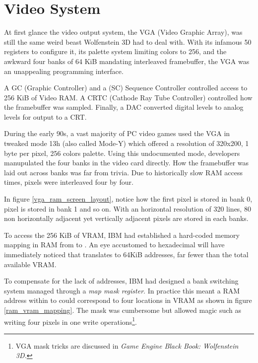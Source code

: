 \section{Video System}
At first glance the video output system, the VGA (Video Graphic Array), was still the same weird beast Wolfenstein 3D had to deal with. With its infamous 50 registers to configure it, its palette system limiting colors to 256, and the awkward four banks of 64 KiB mandating interleaved framebuffer, the VGA was an unappealing programming interface.\\
\par
A GC (Graphic Controller) and a (SC) Sequence Controller controlled access to 256 KiB of Video RAM. A CRTC (Cathode Ray Tube Controller) controlled how the framebuffer was sampled. Finally, a DAC converted digital levels to analog levels for output to a CRT.\\
\par 	
{}
\par
During the early 90s, a vast majority of PC video games used the VGA in tweaked mode 13h (also called Mode-Y) which offered a resolution of 320x200, 1 byte per pixel, 256 colors palette. Using this undocumented mode, developers manupulated the four banks in the video card directly. How the framebuffer was laid out across banks was far from trivia. Due to historically slow RAM access times, pixels were interleaved four by four.




\par
In figure \ref{vga_ram_screen_layout}, notice how the first pixel  is stored in bank 0, pixel  is stored in bank 1 and so on. With an horizontal resolution of 320 lines, 80 non horizontally adjacent yet vertically adjacent pixels are stored in each banks.\\
\par
To access the 256 KiB of VRAM, IBM had established a hard-coded memory mapping in RAM from  to . An eye accustomed to hexadecimal will have immediately noticed that  translates to 64KiB addresses, far fewer than the total available VRAM.\\
\par
 To compensate for the lack of addresses, IBM had designed a bank switching system managed through a \textit{map mask register}. In practice this meant a RAM address within  to  could correspond to four locations in VRAM as shown in figure \ref{ram_vram_mapping}. The mask was cumbersome but allowed magic such as writing four pixels in one write operations\footnote{VGA mask tricks are discussed in \it{Game Engine Black Book: Wolfenstein 3D}.}.



